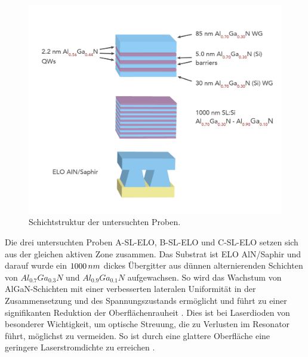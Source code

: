 \begin{figure}[htb]
\includegraphics[width=\linewidth]{Bilder/TS4048/ts4048.png}
\caption{Schichtstruktur der untersuchten Proben.}
\label{fig:schichtenelo}
\end{figure}
\noindent 
Die drei untersuchten Proben A-SL-ELO, B-SL-ELO und C-SL-ELO setzen sich aus der gleichen aktiven Zone zusammen. Das Substrat ist ELO AlN/Saphir und darauf wurde ein $1000 \thinspace nm$ dickes Übergitter aus dünnen alternierenden Schichten von $ Al_{0.7}Ga_{0.3}N$ und $ Al_{0.9}Ga_{0.1}N$ aufgewachsen. So wird das Wachstum von AlGaN-Schichten mit einer verbesserten lateralen Uniformität in der Zusammensetzung und des Spannungszustands ermöglicht und führt zu einer signifikanten Reduktion der Oberflächenrauheit  \cite{doi:10.1002/pssa.201800005} \cite{tino}.
\newline
Dies ist bei Laserdioden von besonderer Wichtigkeit, um optische Streuung, die zu Verlusten im Resonator führt, möglichst zu vermeiden. So ist durch eine glattere Oberfläche eine geringere Laserstromdichte zu erreichen \cite{doi:10.1002/pssa.201870032}.
